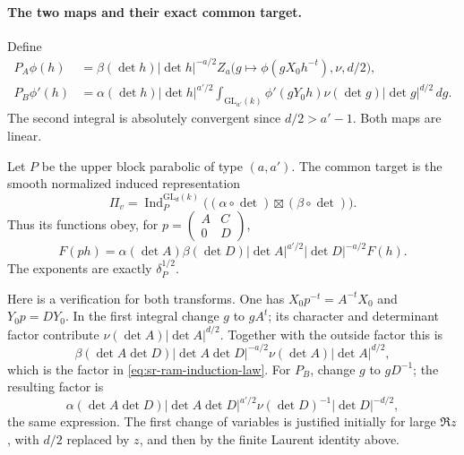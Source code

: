 \paragraph{The two maps and their exact common target.}
Define
\begin{align}
 P_A\phi(h)
 &=\beta(\det h)|\det h|^{-a/2}
       Z_a\bigl(g\mapsto\phi(gX_0h^{-t}),\nu,d/2\bigr),
       \label{eq:sr-ram-PA}\\
 P_B\phi'(h)
 &=\alpha(\det h)|\det h|^{a'/2}
       \int_{\mathrm{GL}_{a'}(k)}
          \phi'(gY_0h)\nu(\det g)|\det g|^{d/2}\,dg .
       \label{eq:sr-ram-PB}
\end{align}
The second integral is absolutely convergent since
\(d/2>a'-1\).  Both maps are linear.

Let \(P\) be the upper block parabolic of type \((a,a')\).
The common target is the smooth normalized induced representation
\[
 \Pi_v=\operatorname{Ind}_{P}^{\mathrm{GL}_d(k)}
           \bigl((\alpha\circ\det)\boxtimes(\beta\circ\det)\bigr).
\]
Thus its functions obey, for
\(p=\left(\begin{smallmatrix}A&C\\0&D\end{smallmatrix}\right)\),
\begin{equation}
 F(ph)=\alpha(\det A)\beta(\det D)
       |\det A|^{a'/2}|\det D|^{-a/2}F(h).
 \label{eq:sr-ram-induction-law}
\end{equation}
The exponents are exactly \(\delta_P^{1/2}\).

Here is a verification for both transforms.  One has
\(X_0p^{-t}=A^{-t}X_0\) and \(Y_0p=DY_0\).
In the first integral change \(g\) to \(gA^t\);
its character and determinant factor contribute
\(\nu(\det A)|\det A|^{d/2}\).
Together with the outside factor this is
\[
 \beta(\det A\det D)|\det A\det D|^{-a/2}
        \nu(\det A)|\det A|^{d/2},
\]
which is the factor in \eqref{eq:sr-ram-induction-law}.
For \(P_B\), change \(g\) to \(gD^{-1}\); the resulting factor is
\[
 \alpha(\det A\det D)|\det A\det D|^{a'/2}
        \nu(\det D)^{-1}|\det D|^{-d/2},
\]
the same expression.  The first change of variables is justified
initially for large \(\Re z\), with \(d/2\) replaced by \(z\),
and then by the finite Laurent identity above.

